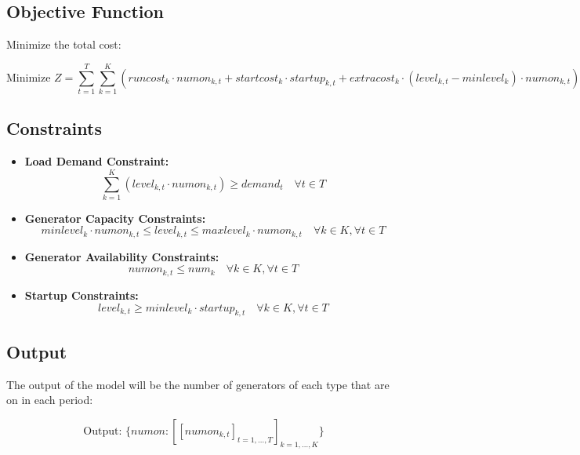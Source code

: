 \documentclass{article}
\begin{document}
\subsection*{Objective Function}
Minimize the total cost:

\[
\text{Minimize } Z = \sum_{t=1}^{T} \sum_{k=1}^{K} \left( runcost_k \cdot numon_{k,t} + startcost_k \cdot startup_{k,t} + extracost_k \cdot (level_{k,t} - minlevel_k) \cdot numon_{k,t} \right)
\]

\subsection*{Constraints}
\begin{itemize}
    \item \textbf{Load Demand Constraint:}
    \[
    \sum_{k=1}^{K} (level_{k,t} \cdot numon_{k,t}) \geq demand_t \quad \forall t \in T
    \]
    
    \item \textbf{Generator Capacity Constraints:}
    \[
    minlevel_k \cdot numon_{k,t} \leq level_{k,t} \leq maxlevel_k \cdot numon_{k,t} \quad \forall k \in K, \forall t \in T
    \]
    
    \item \textbf{Generator Availability Constraints:}
    \[
    numon_{k,t} \leq num_k \quad \forall k \in K, \forall t \in T
    \]

    \item \textbf{Startup Constraints:}
    \[
    level_{k,t} \geq minlevel_k \cdot startup_{k,t} \quad \forall k \in K, \forall t \in T
    \]
\end{itemize}

\subsection*{Output}
The output of the model will be the number of generators of each type that are on in each period:

\[
\text{Output: } \{ numon: [[numon_{k, t}]_{t=1,\ldots,T}]_{k=1,\ldots,K} \}
\]
\end{document}
